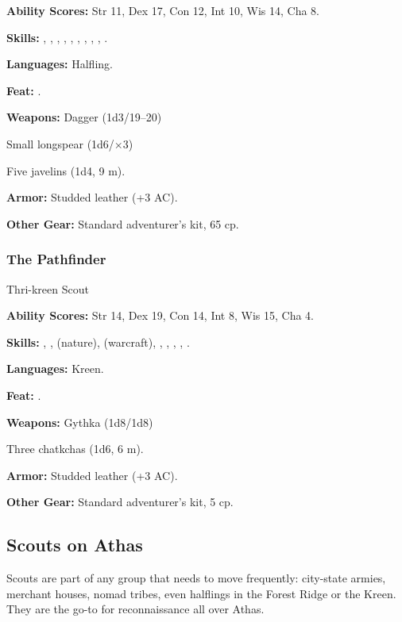 \textbf{Ability Scores:} Str 11, Dex 17, Con 12, Int 10, Wis 14, Cha 8.

\textbf{Skills:} , , , , , , , , , .

\textbf{Languages:} Halfling.

\textbf{Feat:} .

\textbf{Weapons:} Dagger (1d3/19--20)

Small longspear (1d6/$\times$3)

Five javelins (1d4, 9 m).

\textbf{Armor:} Studded leather (+3 AC).

\textbf{Other Gear:} Standard adventurer's kit, 65 cp.

\subsubsection{The Pathfinder}
Thri-kreen Scout

\textbf{Ability Scores:} Str 14, Dex 19, Con 14, Int 8, Wis 15, Cha 4.

\textbf{Skills:} , ,  (nature),  (warcraft), , , , , .

\textbf{Languages:} Kreen.

\textbf{Feat:} .

\textbf{Weapons:} Gythka (1d8/1d8)

Three chatkchas (1d6, 6 m).

\textbf{Armor:} Studded leather (+3 AC).

\textbf{Other Gear:} Standard adventurer's kit, 5 cp.

\subsection{Scouts on Athas}

Scouts are part of any group that needs to move frequently: city-state armies, merchant houses, nomad tribes, even halflings in the Forest Ridge or the Kreen. They are the go-to for reconnaissance all over Athas.

